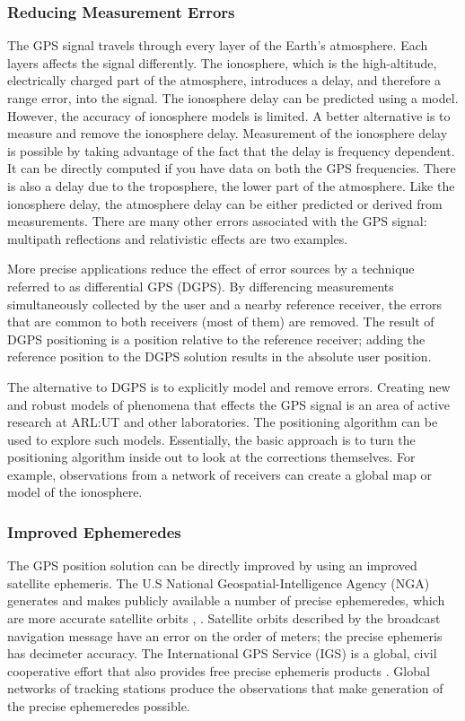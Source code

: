 \subsubsection{Reducing Measurement Errors}

The GPS signal travels through every layer of the Earth's atmosphere. Each layers affects the signal differently. The ionosphere, which is the high-altitude, electrically charged part of the atmosphere, introduces a delay, and therefore a range error, into the signal. The ionosphere delay can be predicted using a model. However, the accuracy of ionosphere models is limited. A better alternative is to measure and remove the ionosphere delay. Measurement of the ionosphere delay is possible by taking advantage of the fact that the delay is frequency dependent. It can be directly computed if you have data on both the GPS frequencies. There is also a delay due to the troposphere, the lower part of the atmosphere. Like the ionosphere delay, the atmosphere delay can be either predicted or derived from measurements. There are many other errors associated with the GPS signal: multipath reflections and relativistic effects are two examples.

More precise applications reduce the effect of error sources by a technique referred to as differential GPS (DGPS). By differencing measurements simultaneously collected by the user and a nearby reference receiver, the errors that are common to both receivers (most of them) are removed. The result of DGPS positioning is a position relative to the reference receiver; adding the reference position to the DGPS solution results in the absolute user position.

The alternative to DGPS is to explicitly model and remove errors. Creating new and robust models of phenomena that effects the GPS signal is an area of active research at ARL:UT and other laboratories. The positioning algorithm can be used to explore such models. Essentially, the basic approach is to turn the positioning algorithm inside out to look at the corrections themselves. For example, observations from a network of receivers can create a global map or model of the ionosphere.


\subsubsection{Improved Ephemeredes}

The GPS position solution can be directly improved by using an improved satellite ephemeris. The U.S National Geospatial-Intelligence Agency (NGA) generates and makes publicly available a number of precise ephemeredes, which are more accurate satellite orbits \cite{iongnss04}, \cite{nga:website}. Satellite orbits described by the broadcast navigation message have an error on the order of meters; the precise ephemeris has decimeter accuracy. The International GPS Service (IGS) is a global, civil cooperative effort that also provides free precise ephemeris products \cite{igs:reference}. Global networks of tracking stations produce the observations that make generation of the precise ephemeredes possible.



